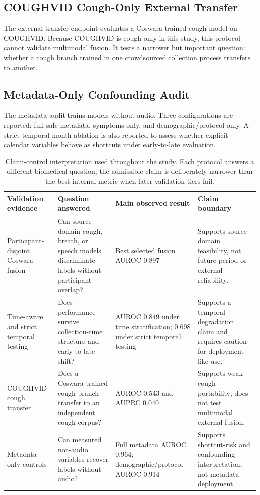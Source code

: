 \documentclass[journal]{IEEEtran}
\begin{document}
\subsection{COUGHVID Cough-Only External Transfer}
The external transfer endpoint evaluates a Coswara-trained cough model on COUGHVID. Because COUGHVID is cough-only in this study, this protocol cannot validate multimodal fusion. It tests a narrower but important question: whether a cough branch trained in one crowdsourced collection process transfers to another.

\subsection{Metadata-Only Confounding Audit}
The metadata audit trains models without audio. Three configurations are reported: full safe metadata, symptoms only, and demographic/protocol only. A strict temporal month-ablation is also reported to assess whether explicit calendar variables behave as shortcuts under early-to-late evaluation.

\begin{table}[t]
\caption{Claim-control interpretation used throughout the study. Each protocol answers a different biomedical question; the admissible claim is deliberately narrower than the best internal metric when later validation tiers fail.}
\label{tab:claim_control}
\centering
\scriptsize
\begin{tabularx}{\textwidth}{p{} p{} p{} Y}
\toprule
Validation evidence & Question answered & Main observed result & Claim boundary \\
\midrule
Participant-disjoint Coswara fusion & Can source-domain cough, breath, or speech models discriminate labels without participant overlap? & Best selected fusion AUROC 0.897 & Supports source-domain feasibility, not future-period or external reliability. \\
Time-aware and strict temporal testing & Does performance survive collection-time structure and early-to-late shift? & AUROC 0.849 under time stratification; 0.698 under strict temporal testing & Supports a temporal degradation claim and requires caution for deployment-like use. \\
COUGHVID cough transfer & Does a Coswara-trained cough branch transfer to an independent cough corpus? & AUROC 0.543 and AUPRC 0.040 & Supports weak cough portability; does not test multimodal external fusion. \\
Metadata-only controls & Can measured non-audio variables recover labels without audio? & Full metadata AUROC 0.964; demographic/protocol AUROC 0.914 & Supports shortcut-risk and confounding interpretation, not metadata deployment. \\
\bottomrule
\end{tabularx}
\end{table}
\end{document}
